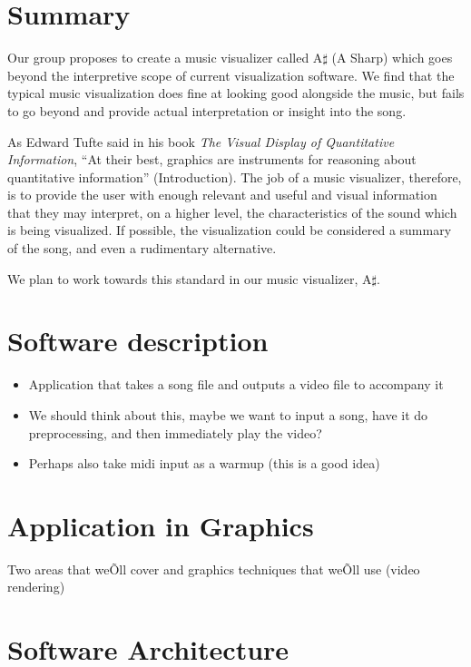 \documentclass{article}
\begin{document}
\section{Summary}

Our group proposes to create a music visualizer called A$\sharp$ (A Sharp) which goes beyond the interpretive scope of current visualization software.  We find that the typical music visualization does fine at looking good alongside the music, but fails to go beyond and provide actual interpretation or insight into the song.

As Edward Tufte said in his book \textit{The Visual Display of Quantitative Information}, ``At their best, graphics are instruments for reasoning about quantitative information'' (Introduction).  The job of a music visualizer, therefore, is to provide the user with enough relevant and useful and visual information that they may interpret, on a higher level, the characteristics of the sound which is being visualized.  If possible, the visualization could be considered a summary of the song, and even a rudimentary alternative.

We plan to work towards this standard in our music visualizer, A$\sharp$.

\section{Software description}

\begin{itemize}
	\item Application that takes a song file and outputs a video file to accompany it
	\item We should think about this, maybe we want to input a song, have it do preprocessing, and then immediately play the video?
	\item Perhaps also take midi input as a warmup (this is a good idea)
\end{itemize}

\section{Application in Graphics}

Two areas that weÕll cover and graphics techniques that weÕll use (video rendering)

\section{Software Architecture}
\end{document}
